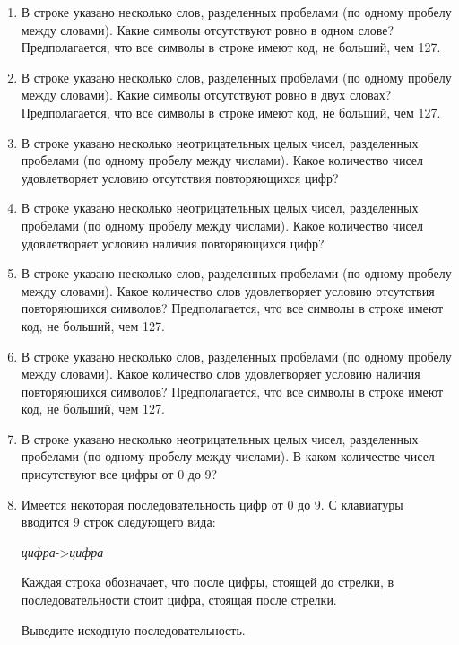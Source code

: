 \begin{enumerate}
\item В строке указано несколько слов, разделенных пробелами (по одному
пробелу между словами). Какие символы отсутствуют ровно в одном слове?
Предполагается, что все символы в строке имеют код, не больший, чем 127.

\item В строке указано несколько слов, разделенных пробелами (по одному
пробелу между словами). Какие символы отсутствуют ровно в двух словах?
Предполагается, что все символы в строке имеют код, не больший, чем 127.



\item В строке указано несколько неотрицательных целых чисел, разделенных пробелами (по одному
пробелу между числами). Какое количество чисел удовлетворяет условию отсутствия
повторяющихся цифр? 

\item В строке указано несколько неотрицательных целых чисел, разделенных пробелами (по одному
пробелу между числами). Какое количество чисел удовлетворяет условию наличия
повторяющихся цифр? 

\item В строке указано несколько слов, разделенных пробелами (по одному
пробелу между словами). Какое количество слов удовлетворяет условию отсутствия
повторяющихся символов? 
Предполагается, что все символы в строке имеют код, не больший, чем 127.


\item В строке указано несколько слов, разделенных пробелами (по одному
пробелу между словами). Какое количество слов удовлетворяет условию наличия
повторяющихся символов? 
Предполагается, что все символы в строке имеют код, не больший, чем 127.


\item В строке указано несколько неотрицательных целых чисел, разделенных пробелами (по одному
пробелу между числами). В каком количестве чисел присутствуют все цифры от
0 до 9?

\item Имеется некоторая последовательность цифр от $0$ до $9$. 
С клавиатуры вводится $9$ строк следующего вида:

\textit{цифра}->\textit{цифра}

Каждая строка обозначает, что после цифры, стоящей до стрелки, в последовательности стоит цифра, стоящая после стрелки. 

Выведите исходную последовательность.


\end{enumerate}
